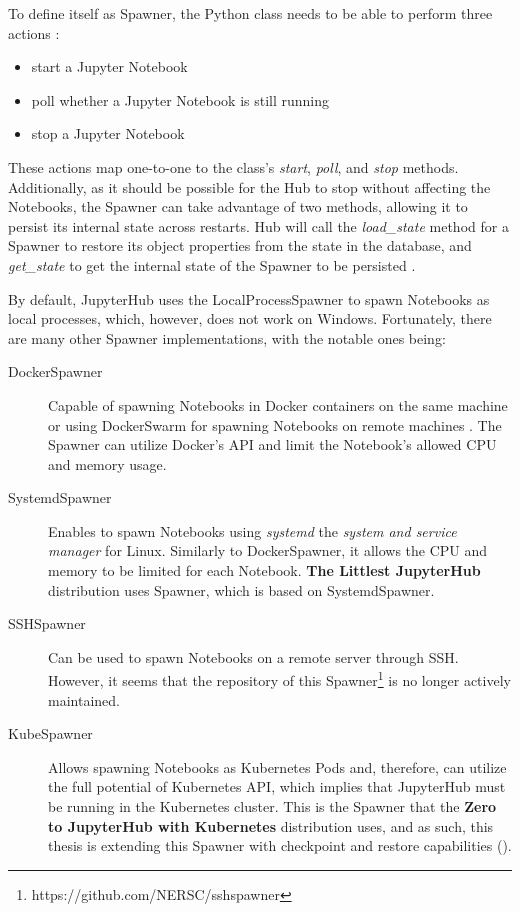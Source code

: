 \documentclass[
  digital,     %
  oneside,     %
  nosansbold,  %
  nocolorbold, %
  lof,         %
  nolot,         %
]{fithesis4}
\begin{document}
To define itself as Spawner, the Python class needs to be able to perform three actions \cite{jupyterhub_spawner}:
\begin{itemize}
  \item start a Jupyter Notebook
  \item poll whether a Jupyter Notebook is still running
  \item stop a Jupyter Notebook
\end{itemize}
These actions map one-to-one to the class's \emph{start}, \emph{poll}, and \emph{stop} methods. Additionally, as it should be possible for the Hub to stop without affecting the Notebooks, the Spawner can take advantage of two methods, allowing it to persist its internal state across restarts. Hub will call the \emph{load\_state} method for a Spawner to restore its object properties from the state in the database, and \emph{get\_state} to get the internal state of the Spawner to be persisted \cite{jupyterhub_spawner}.

By default, JupyterHub uses the LocalProcessSpawner to spawn Notebooks as local processes, which, however, does not work on Windows. Fortunately, there are many other Spawner implementations, with the notable ones being:
\begin{description}

    \item[DockerSpawner] Capable of spawning Notebooks in Docker containers on the same machine or using DockerSwarm for spawning Notebooks on remote machines \cite{jupyterhub_spawner}. The Spawner can utilize Docker's API and limit the Notebook's allowed CPU and memory usage.
    
    \item[SystemdSpawner]
    Enables to spawn Notebooks using \emph{systemd} the \emph{system and service manager} \cite{systemd} for Linux. Similarly to DockerSpawner, it allows the CPU and memory to be limited for each Notebook. \textbf{The Littlest JupyterHub} distribution uses Spawner, which is based on SystemdSpawner.

    \item[SSHSpawner]
    Can be used to spawn Notebooks on a remote server through SSH. However, it seems that the repository of this Spawner\footnote{https://github.com/NERSC/sshspawner} is no longer actively maintained.

    \item[KubeSpawner]
    Allows spawning Notebooks as Kubernetes Pods and, therefore, can utilize the full potential of Kubernetes API, which implies that JupyterHub must be running in the Kubernetes cluster. This is the Spawner that the \textbf{Zero to JupyterHub with Kubernetes} distribution uses, and as such, this thesis is extending this Spawner with checkpoint and restore capabilities ().
    
\end{description}
\end{document}
